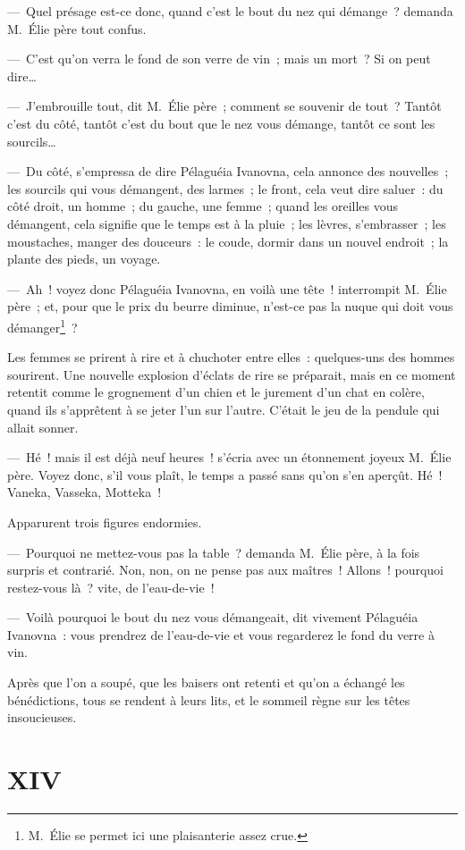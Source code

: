 \documentclass[french,twoside]{book} %
\begin{document}
— Quel présage est-ce donc, quand c’est le bout du nez qui démange ? demanda M. Élie père tout confus.\par
— C’est qu’on verra le fond de son verre de vin ; mais un mort ? Si on peut dire…\par
— J’embrouille tout, dit M. Élie père ; comment se souvenir de tout ? Tantôt c’est du côté, tantôt c’est du bout que le nez vous démange, tantôt ce sont les sourcils…\par
— Du côté, s’empressa de dire Pélaguéia Ivanovna, cela annonce des nouvelles ; les sourcils qui vous démangent, des larmes ; le front, cela veut dire saluer : du côté droit, un homme ; du gauche, une femme ; quand les oreilles vous démangent, cela signifie que le temps est à la pluie ; les lèvres, s’embrasser ; les moustaches, manger des douceurs : le coude, dormir dans un nouvel endroit ; la plante des pieds, un voyage.\par
— Ah ! voyez donc Pélaguéia Ivanovna, en voilà une tête ! interrompit M. Élie père ; et, pour que le prix du beurre diminue, n’est-ce pas la nuque qui doit vous démanger\footnote{M. Élie se permet ici une plaisanterie assez crue.} ?\par
Les femmes se prirent à rire et à chuchoter entre elles : quelques-uns des hommes sourirent. Une nouvelle explosion d’éclats de rire se préparait, mais en ce moment retentit comme le grognement d’un chien et le jurement d’un chat en colère, quand ils s’apprêtent à se jeter l’un sur l’autre. C’était le jeu de la pendule qui allait sonner.\par
— Hé ! mais il est déjà neuf heures ! s’écria avec un étonnement joyeux M. Élie père. Voyez donc, s’il vous plaît, le temps a passé sans qu’on s’en aperçût. Hé ! Vaneka, Vasseka, Motteka !\par
Apparurent trois figures endormies.\par
— Pourquoi ne mettez-vous pas la table ? demanda M. Élie père, à la fois surpris et contrarié. Non, non, on ne pense pas aux maîtres ! Allons ! pourquoi restez-vous là ? vite, de l’eau-de-vie !\par
— Voilà pourquoi le bout du nez vous démangeait, dit vivement Pélaguéia Ivanovna : vous prendrez de l’eau-de-vie et vous regarderez le fond du verre à vin.\par
Après que l’on a soupé, que les baisers ont retenti et qu’on a échangé les bénédictions, tous se rendent à leurs lits, et le sommeil règne sur les têtes insoucieuses.
\section[{XIV}]{XIV}\renewcommand{\leftmark}{XIV}
\end{document}

